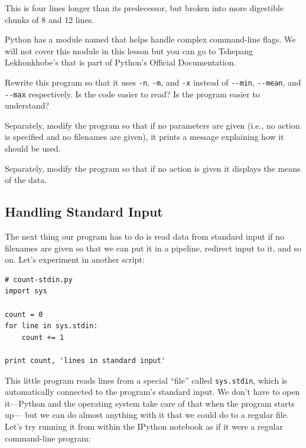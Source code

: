 This is four lines longer than its predecessor, but broken into more
digestible chunks of 8 and 12 lines.

Python has a module named
 that
helps handle complex command-line flags. We will not cover this module
in this lesson but you can go to Tshepang Lekhonkhobe's
that is part of Python's Official Documentation.

\begin{challenge}
  Rewrite this program so that it uses \texttt{-n}, \texttt{-m}, and
  \texttt{-x} instead of \texttt{-{}-min}, \texttt{-{}-mean}, and
  \texttt{-{}-max} respectively. Is the code easier to read? Is the
  program easier to understand?
\end{challenge}

\begin{challenge}
  Separately, modify the program so that if no parameters are given
  (i.e., no action is specified and no filenames are given), it prints a
  message explaining how it should be used.
\end{challenge}

\begin{challenge}
  Separately, modify the program so that if no action is given it
  displays the means of the data.
\end{challenge}

\subsection{Handling Standard Input}

The next thing our program has to do is read data from standard input if
no filenames are given so that we can put it in a pipeline, redirect
input to it, and so on. Let's experiment in another script:

\begin{Verbatim}
# count-stdin.py
import sys

count = 0
for line in sys.stdin:
    count += 1

print count, 'lines in standard input'
\end{Verbatim}

This little program reads lines from a special ``file'' called
\texttt{sys.stdin}, which is automatically connected to the program's
standard input. We don't have to open it---Python and the operating
system take care of that when the program starts up--- but we can do
almost anything with it that we could do to a regular file. Let's try
running it from within the IPython notebook as if it were a regular command-line program:

